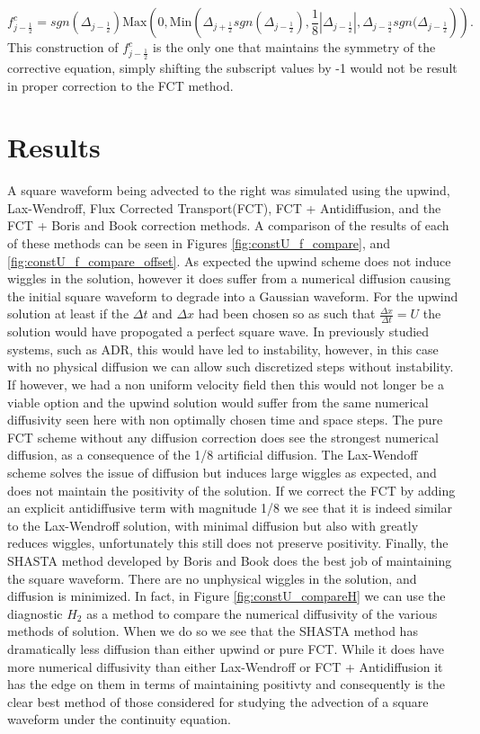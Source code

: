 \documentclass[]{article}
\begin{document}
\begin{equation}
f^c_{j-\frac{1}{2}} = sgn(\Delta_{j-\frac{1}{2}}) \text{Max}\left(0,\text{Min}\left(\Delta_{j+\frac{1}{2}} sgn(\Delta_{j-\frac{1}{2}}), \frac{1}{8}|\Delta_{j-\frac{1}{2}}|,\Delta_{j-\frac{3}{2}} sgn(\Delta_{j-\frac{1}{2}}\right)\right).
\label{eq:def_fc_left}
\end{equation}
This construction of $f^c_{j-\frac{1}{2}}$ is the only one that maintains the symmetry of the corrective equation, simply shifting the subscript values by -1 would not be result in proper correction to the FCT method. 

\section{Results}
A square waveform being advected to the right was simulated using the upwind, Lax-Wendroff, Flux Corrected Transport(FCT), FCT + Antidiffusion, and the FCT + Boris and Book correction methods. A comparison of the results of each of these methods can be seen in Figures \ref{fig:constU_f_compare}, and \ref{fig:constU_f_compare_offset}. As expected the upwind scheme does not induce wiggles in the solution, however it does suffer from a numerical diffusion causing the initial square waveform to degrade into a Gaussian waveform. For the upwind solution at least if the $\Delta t$ and $\Delta x$ had been chosen so as such that $\frac{\Delta x}{\Delta t} = U $ the solution would have propogated a perfect square wave. In previously studied systems, such as ADR, this would have led to instability, however, in this case with no physical diffusion we can allow such discretized steps without instability. If however, we had a non uniform velocity field then this would not longer be a viable option and the upwind solution would suffer from the same numerical diffusivity seen here with non optimally chosen time and space steps. The pure FCT scheme without any diffusion correction does see the strongest numerical diffusion, as a consequence of the 1/8 artificial diffusion. The Lax-Wendoff scheme solves the issue of diffusion but induces large wiggles as expected, and does not maintain the positivity of the solution. If we correct the FCT by adding an explicit antidiffusive term with magnitude 1/8 we see that it is indeed similar to the Lax-Wendroff solution, with minimal diffusion but also with greatly reduces wiggles, unfortunately this still does not preserve positivity. Finally, the SHASTA method developed by Boris and Book does the best job of maintaining the square waveform. There are no unphysical wiggles in the solution, and diffusion is minimized. In fact, in Figure \ref{fig:constU_compareH} we can use the diagnostic $H_2$ as a method to compare the numerical diffusivity of the various methods of solution. When we do so we see that the SHASTA method has dramatically less diffusion than either upwind or pure FCT. While it does have more numerical diffusivity than either Lax-Wendroff or FCT + Antidiffusion it has the edge on them in terms of maintaining positivty and consequently is the clear best method of those considered for studying the advection of a square waveform under the continuity equation. 
\end{document}
